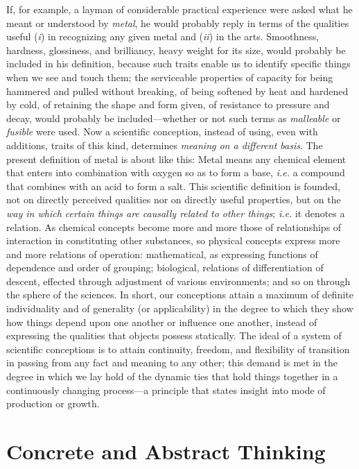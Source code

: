 \documentclass[showtrims,ustradepaper]{memoir}
\begin{document}
If, for example, a layman of considerable practical experience were
asked what he meant or understood by \emph{metal}, he would probably
reply in terms of the qualities useful (\emph{i}) in recognizing any
given metal and (\emph{ii}) in the arts. Smoothness, hardness,
glossiness, and brilliancy, heavy weight for its size, would probably be
included in his definition, because such traits enable us to identify
specific things when we see and touch them; the serviceable properties
of capacity for being hammered and pulled without breaking, of being
softened by heat and hardened by cold, of retaining the shape and
form
given, of resistance to pressure and decay, would probably be
included---whether or not such terms as \emph{malleable} or
\emph{fusible} were used. Now a scientific conception, instead of using,
even with additions, traits of this kind, determines \emph{meaning on a
different basis}. The present definition of metal is about like this:
Metal means any chemical element that enters into combination with
oxygen so as to form a base, \emph{i.e.} a compound that combines with
an acid to form a salt. This scientific definition is founded, not on
directly perceived qualities nor on directly useful properties, but on
the \emph{way in which certain things are causally related to other
things}; \emph{i.e.} it denotes a relation. As chemical concepts become
more and more those of relationships of interaction in constituting
other substances, so physical concepts express more and more relations
of operation: mathematical, as expressing functions of dependence and
order of grouping; biological, relations of differentiation of descent,
effected through adjustment of various environments; and so on through
the sphere of the sciences. In short, our conceptions attain a maximum
of definite individuality and of generality (or applicability) in the
degree to which they show how things depend upon one another or
influence one another, instead of expressing the qualities that objects
possess statically. The ideal of a system of scientific conceptions is
to attain continuity, freedom, and flexibility of transition in passing
from any fact and meaning to any other; this demand is met in the degree
in which we lay hold of the dynamic ties that hold things together in a
continuously changing process---a principle that states insight into
mode of production or
growth.

\chapter{Concrete and Abstract Thinking}
\end{document}
